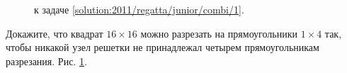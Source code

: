 \ifsolution
\begin{figure}\centering
    \caption{к задаче \ref{solution:2011/regatta/junior/combi/1}.}
    \label{fig:solution:2011/regatta/junior/combi/1}
\end{figure}
\fi %

\problem
Докажите, что квадрат $16 \times 16$ можно разрезать на прямоугольники
$1 \times 4$ так, чтобы никакой узел решетки не принадлежал четырем
прямоугольникам разрезания.
\solution
\label{solution:2011/regatta/junior/combi/1}%
Рис. \ref{fig:solution:2011/regatta/junior/combi/1}.
\endproblem
